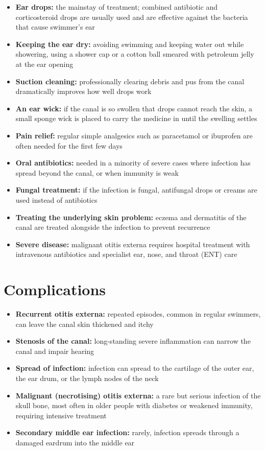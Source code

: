 \begin{itemize}
    \item \textbf{Ear drops:} the mainstay of treatment; combined antibiotic and corticosteroid drops are usually used and are effective against the bacteria that cause swimmer's ear
    \item \textbf{Keeping the ear dry:} avoiding swimming and keeping water out while showering, using a shower cap or a cotton ball smeared with petroleum jelly at the ear opening
    \item \textbf{Suction cleaning:} professionally clearing debris and pus from the canal dramatically improves how well drops work
    \item \textbf{An ear wick:} if the canal is so swollen that drops cannot reach the skin, a small sponge wick is placed to carry the medicine in until the swelling settles
    \item \textbf{Pain relief:} regular simple analgesics such as paracetamol or ibuprofen are often needed for the first few days
    \item \textbf{Oral antibiotics:} needed in a minority of severe cases where infection has spread beyond the canal, or when immunity is weak
    \item \textbf{Fungal treatment:} if the infection is fungal, antifungal drops or creams are used instead of antibiotics
    \item \textbf{Treating the underlying skin problem:} eczema and dermatitis of the canal are treated alongside the infection to prevent recurrence
    \item \textbf{Severe disease:} malignant otitis externa requires hospital treatment with intravenous antibiotics and specialist ear, nose, and throat (ENT) care
\end{itemize}

\section*{Complications}
\begin{itemize}
    \item \textbf{Recurrent otitis externa:} repeated episodes, common in regular swimmers, can leave the canal skin thickened and itchy
    \item \textbf{Stenosis of the canal:} long-standing severe inflammation can narrow the canal and impair hearing
    \item \textbf{Spread of infection:} infection can spread to the cartilage of the outer ear, the ear drum, or the lymph nodes of the neck
    \item \textbf{Malignant (necrotising) otitis externa:} a rare but serious infection of the skull bone, most often in older people with diabetes or weakened immunity, requiring intensive treatment
    \item \textbf{Secondary middle ear infection:} rarely, infection spreads through a damaged eardrum into the middle ear
\end{itemize}

